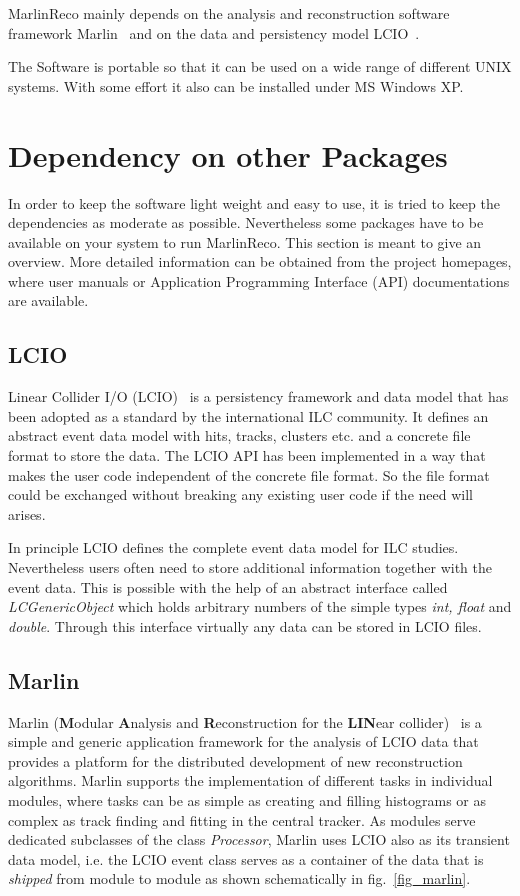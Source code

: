 MarlinReco mainly depends on the analysis and reconstruction 
software framework Marlin~\cite{ref_marlin} and on the data and persistency 
model LCIO~\cite{ref_lcio,ref_lciohome}.

The Software is portable so that it can be used on a wide range of 
different UNIX systems. With some effort it also can be installed under
MS Windows XP.  

\section{Dependency on other Packages}

In order to keep the software light weight and easy to use, 
it is tried to keep the dependencies as moderate as possible.
Nevertheless some packages have to be available on your system to run  
MarlinReco. This section is meant to give an overview. More detailed 
information can be obtained from the project homepages, where user manuals or 
Application Programming Interface (API) documentations are available.

\subsection{LCIO}

Linear Collider I/O (LCIO)~\cite{ref_lcio,ref_lciohome} is a persistency framework and data model 
that has been adopted as a standard by the international ILC community. 
It defines an abstract event data model with hits, tracks, clusters etc. and 
a concrete file format to store the data. The LCIO API 
has been implemented in a way that makes the user code
independent of the concrete file format. So the file format could be exchanged
without breaking any existing user code if the need will arises. 

In principle LCIO defines the complete event data model for ILC studies.
Nevertheless users often need to store additional information together with 
the event data.
This is possible with the help of an abstract interface called
{\em LCGenericObject} which holds arbitrary numbers of the simple types
{\em int, float} and {\em double}. Through this interface virtually any data
can be stored in LCIO files.

\subsection{Marlin}

Marlin ({\bf M}odular {\bf A}nalysis and {\bf R}econstruction for the
{\bf LIN}ear collider)~\cite{ref_marlin} is a simple and generic
\CPP application framework for the analysis of LCIO data that provides a
platform for the distributed development of new reconstruction
algorithms. Marlin supports the implementation of different tasks in individual
modules, where tasks can be as simple as creating and filling 
histograms or as complex as track finding and fitting
in the central tracker. As modules serve dedicated subclasses of
the class {\em Processor},
Marlin uses LCIO also as its transient data model, i.e.
the LCIO event class serves as a container of the data that is
{\em shipped} from module to module as shown schematically in 
fig.~\ref{fig_marlin}. 

